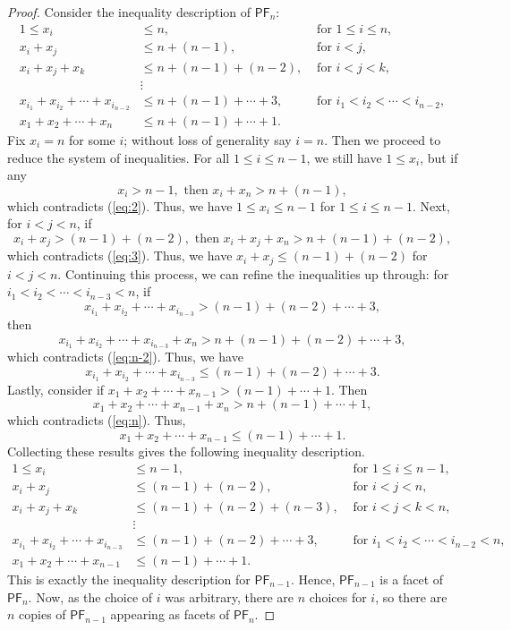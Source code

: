 \documentclass[11pt]{amsart}
\theoremstyle{definition}
\newcommand{\0}{\emptyset}
\newcommand{\PF}{\mathsf{PF}}
\begin{document}
\begin{proof}
Consider the inequality description of $\PF_n$:
\begin{align}
    1 \leq x_i &\leq n, &\text{ for } 1 \leq i \leq n,\label{eq:1}\\
    x_i+x_j &\leq n + (n-1), &\text{ for } i < j,\label{eq:2}\\
    x_i+x_j+x_k &\leq n + (n-1) + (n-2), &\text{ for } i < j < k,\label{eq:3}\\
    &\vdots\nonumber\\
    x_{i_1}+ x_{i_2}+ \cdots + x_{i_{n-2}} &\leq n + (n-1) + \cdots + 3, &\text{ for } i_1 < i_2 < \cdots < i_{n-2},\label{eq:n-2}\\
    x_{1}+ x_{2}+ \cdots + x_{n} &\leq n + (n-1) + \cdots + 1.\label{eq:n}
\end{align}
Fix $x_i = n$ for some $i$; without loss of generality say $i=n$. 
Then we proceed to reduce the system of inequalities.
For all $1 \leq i \leq n-1$, we still have $1 \leq x_i$, but if any \[x_i > n - 1, \text{ then } x_i + x_n >  n + (n-1),\] which contradicts (\ref{eq:2}).
Thus, we have $1 \leq x_i \leq n-1$ for $1 \leq i \leq n-1$. 
Next, for $i < j < n$, if \[x_i + x_j > (n-1) + (n-2), \text{ then } x_i + x_j + x_n > n + (n-1) + (n-2),\] which contradicts (\ref{eq:3}). 
Thus, we have $x_i + x_j \leq (n-1) + (n-2)$ for $i < j < n$. 
Continuing this process, we can refine the inequalities up through: for $i_1 < i_2 < \cdots < i_{n-3} < n$, if \[x_{i_1} + x_{i_2} + \cdots + x_{i_{n-3}} > (n-1) + (n-2) + \cdots + 3,\] then \[x_{i_1} + x_{i_2} + \cdots + x_{i_{n-3}} + x_n > n + (n-1) + (n-2) + \cdots +3,\] which contradicts (\ref{eq:n-2}). 
Thus, we have \[x_{i_1} + x_{i_2} + \cdots + x_{i_{n-3}} \leq (n-1) + (n-2) + \cdots + 3.\] 
Lastly, consider if $x_1 + x_2 + \cdots + x_{n-1} > (n-1) + \cdots +1$. 
Then \[x_1 + x_2 + \cdots + x_{n-1} + x_n >  n+ (n-1) + \cdots +1,\] which contradicts (\ref{eq:n}). 
Thus, \[x_1 + x_2 + \cdots + x_{n-1} \leq (n-1) + \cdots +1.\]
Collecting these results gives the following inequality description.
\begin{align*}
    1 \leq x_i &\leq n-1, &\text{ for } 1 \leq i \leq n-1,\\
    x_i+x_j &\leq (n-1) + (n-2), &\text{ for } i < j < n,\\
    x_i+x_j+x_k &\leq (n-1) + (n-2) + (n-3), &\text{ for } i < j < k < n,\\
    &\vdots\\
    x_{i_1}+ x_{i_2}+ \cdots + x_{i_{n-3}} &\leq (n-1) + (n-2) + \cdots + 3, &\text{ for } i_1 < i_2 < \cdots < i_{n-2} < n,\\
    x_{1}+ x_{2}+ \cdots + x_{n-1} &\leq  (n-1) + \cdots + 1.
\end{align*}
This is exactly the inequality description for $\PF_{n-1}$. 
Hence, $\PF_{n-1}$ is a facet of $\PF_n$.
Now, as the choice of $i$ was arbitrary, there are $n$ choices for $i$, so there are $n$ copies of $\PF_{n-1}$ appearing as facets of $\PF_n$. 


\end{proof}
\end{document}
